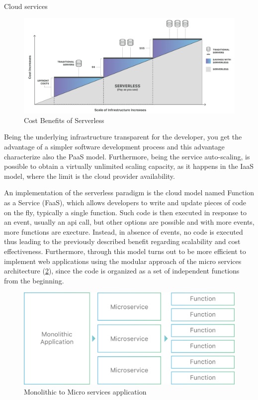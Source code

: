 \begin{chapter}{Cloud services}
    \begin{figure}
        \centering
        \includegraphics[width=\linewidth]{source/images/benefits-of-serverless.png}
        \caption{Cost Benefits of Serverless}
        \label{fig:serverless_benefits}
    \end{figure}

    Being the underlying infrastructure transparent for the developer, you get the advantage
    of a simpler software development process and this advantage characterize also
    the PaaS model. Furthermore, being the service auto-scaling, is possible to obtain
    a virtually unlimited scaling capacity, as it happens in the IaaS model, where the
    limit is the cloud provider availability.

    An implementation of the serverless paradigm is the cloud model named Function
    as a Service (FaaS), which allows developers to write and update pieces of code
    on the fly, typically a single function.
    Such code is then executed in response to an event, usually an api call, but other
    options are possible and with more events, more functions are execture. Instead,
    in absence of events, no code is executed thus leading to the previously described
    benefit regarding scalability and cost effectiveness.
    Furthermore, through this model turns out to be more efficient to implement web
    applications using the modular approach of the micro services architecture
    (\ref{fig:monolithic_to_microservices}), since the code is organized as a set of
    independent functions from the beginning.

    \begin{figure}
        \centering
        \includegraphics[width=\linewidth]{source/images/monolithic-application-microservice-faas.png}
        \caption{Monolithic to Micro services application}
        \label{fig:monolithic_to_microservices}
    \end{figure}


\end{chapter}

